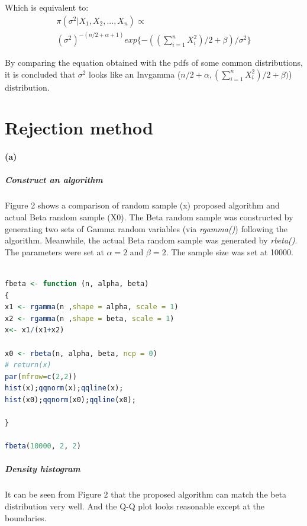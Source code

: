\documentclass[10pt, letterpaper]{proc}
\begin{document}
Which is equivalent to:
\begin{equation}
\begin{aligned}
	\pi (\sigma^2| X_1, X_2, ..., X_n)  \propto \\ (\sigma^2)^{-(n/2 + \alpha + 1)}exp\{-((\sum_{i=1}^{n} X_i^{2})/2 + \beta)/\sigma^2\}
\end{aligned}
\end{equation}


By comparing the equation obtained with the pdfs of some common distributions, it is concluded that $\sigma^2 $ looks like an  Invgamma ($ n/2 + \alpha, (\sum_{i=1}^{n} X_i^{2})/2 + \beta) $) distribution. 

\section{Rejection method}

\paragraph{(a)} 
\subparagraph{Construct an algorithm}Figure 2 shows a comparison of random sample (x) proposed algorithm and actual Beta random sample (X0). The Beta random sample was constructed by generating two sets of Gamma random variables (via \textit{rgamma()}) following the algorithm. Meanwhile, the actual Beta random sample was generated by \textit{rbeta()}. The parameters were set at $\alpha = 2$ and $\beta = 2$. The sample size was set at 10000. 
\begin{lstlisting}[language=R, breaklines=T, basicstyle=\footnotesize\ttfamily]

fbeta <- function (n, alpha, beta)
{
x1 <- rgamma(n ,shape = alpha, scale = 1)
x2 <- rgamma(n ,shape = beta, scale = 1)
x<- x1/(x1+x2)

x0 <- rbeta(n, alpha, beta, ncp = 0)
# return(x)
par(mfrow=c(2,2))  
hist(x);qqnorm(x);qqline(x);
hist(x0);qqnorm(x0);qqline(x0);

}

fbeta(10000, 2, 2)

\end{lstlisting}

\subparagraph{Density histogram }It can be seen from Figure 2 that the proposed algorithm can match the beta distribution very well. And the Q-Q plot looks reasonable except at the boundaries.  
\end{document}
